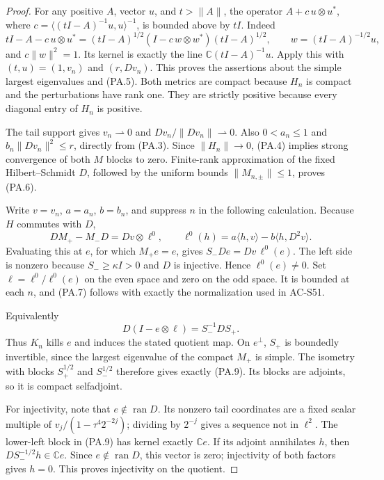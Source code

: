 \begin{proof}
For any positive \(A\), vector \(u\), and \(t>\|A\|\), the
operator \(A+c\,u\otimes u^*\), where
\(c=\langle(tI-A)^{-1}u,u\rangle^{-1}\), is bounded above by
\(tI\).  Indeed
\[
 tI-A-c\,u\otimes u^*
 =(tI-A)^{1/2}
 \left(I-c\,w\otimes w^*\right)(tI-A)^{1/2},
 \qquad w=(tI-A)^{-1/2}u,
\]
and \(c\|w\|^2=1\).  Its kernel is exactly the line
\(\mathbb C(tI-A)^{-1}u\).  Apply this with \((t,u)=(1,v_n)\)
and \((r,Dv_n)\).  This proves the assertions about the simple
largest eigenvalues and (PA.5).  Both metrics are compact because
\(H_n\) is compact and the perturbations have rank one.  They
are strictly positive because every diagonal entry of \(H_n\)
is positive.

The tail support gives \(v_n\rightharpoonup0\) and
\(Dv_n/\|Dv_n\|\rightharpoonup0\).  Also \(0<a_n\le1\) and
\(b_n\|Dv_n\|^2\le r\), directly from (PA.3).
Since \(\|H_n\|\to0\), (PA.4) implies strong convergence of
both \(M\) blocks to zero.  Finite-rank approximation of the fixed
Hilbert--Schmidt \(D\), followed by the uniform bounds
\(\|M_{n,\pm}\|\le1\), proves (PA.6).

Write \(v=v_n\), \(a=a_n\), \(b=b_n\), and suppress \(n\)
in the following calculation.  Because \(H\) commutes with \(D\),
\[
 DM_+-M_-D=Dv\otimes\ell^0,
 \qquad
 \ell^0(h)=a\langle h,v\rangle-b\langle h,D^2v\rangle.
 \tag{PA.11}
\]
Evaluating this at \(e\), for which \(M_+e=e\), gives
\(S_-De=Dv\,\ell^0(e)\).  The left side is nonzero because
\(S_-\ge\kappa I>0\) and \(D\) is injective.  Hence
\(\ell^0(e)\ne0\).  Set
\(\ell=\ell^0/\ell^0(e)\) on the even space and zero on the
odd space.  It is bounded at each \(n\), and (PA.7) follows
with exactly the normalization used in AC-S51.

Equivalently
\[
 D(I-e\otimes\ell)=S_-^{-1}D S_+.
 \tag{PA.12}
\]
Thus \(K_n\) kills \(e\) and induces the stated quotient map.
On \(e^\perp\), \(S_+\) is boundedly invertible, since the
largest eigenvalue of the compact \(M_+\) is simple.  The
isometry with blocks \(S_+^{1/2}\) and \(S_-^{1/2}\)
therefore gives exactly (PA.9).  Its blocks are adjoints, so
it is compact selfadjoint.

For injectivity, note that \(e\notin\operatorname{ran}D\).
Its nonzero tail coordinates are a fixed scalar multiple of
\(v_j/(1-\tau^4 2^{-2j})\); dividing by \(2^{-j}\) gives a
sequence not in \(\ell^2\).
The lower-left block in (PA.9) has kernel exactly \(\mathbb C e\).
If its adjoint annihilates \(h\), then
\(D S_-^{-1/2}h\in\mathbb C e\).  Since \(e\notin\operatorname{ran}D\),
this vector is zero; injectivity of both factors gives \(h=0\).
This proves injectivity on the quotient.


\end{proof}
